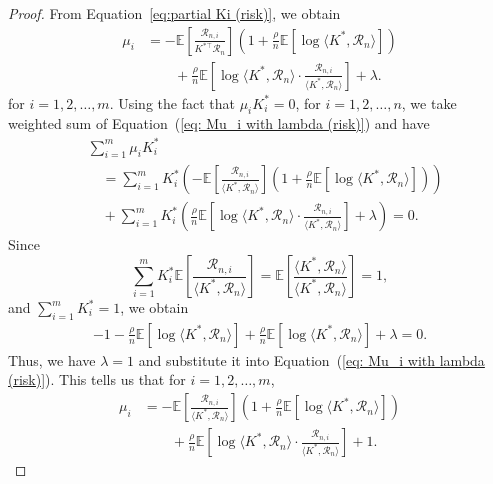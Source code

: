 \documentclass[10pt,a4paper]{amsart}
\begin{document}
\begin{proof}
From Equation~\eqref{eq:partial Ki (risk)}, we obtain
    \begin{align} \label{eq: Mu_i with lambda (risk)}
        \mu_i 
        &= -\mathbb{E}\left[ \frac{\mathcal{R}_{n,i}}{K^{*\top}\mathcal{R}_n} \right] \left( 1 + \frac{\rho}{n}\mathbb{E}\left[ \log \langle K^{*}, \mathcal{R}_n \rangle \right] \right) \nonumber \\
        &\qquad +\frac{\rho}{n}\mathbb{E}\left[ \log \langle K^{*}, \mathcal{R}_n \rangle \cdot \frac{\mathcal{R}_{n,i}}{ \langle K^{*}, \mathcal{R}_n \rangle }  \right] +\lambda.
    \end{align}
for $i=1,2, \ldots, m$. Using the fact that $\mu_i K_i^* = 0$, for $i=1,2,\dots,n$, we take weighted sum of Equation~(\ref{eq: Mu_i with lambda (risk)}) and have
    \begin{align*}
        &\sum_{i=1}^m \mu_i K_i^* \\
        &\quad = \sum_{i=1}^m K_i^* \left( -\mathbb{E}\left[ \frac{\mathcal{R}_{n,i}}{ \langle K^{*}, \mathcal{R}_n \rangle } \right] \left( 1 + \frac{\rho}{n}\mathbb{E}\left[ \log \langle K^{*}, \mathcal{R}_n \rangle \right] \right) \right) \\
        &\quad + \sum_{i=1}^m K_i^* \left( \frac{\rho}{n} \mathbb{E} \left[ \log \langle K^{*}, \mathcal{R}_n\rangle \cdot \frac{ \mathcal{R}_{n,i} }{\langle K^{*}, \mathcal{R}_n \rangle}  \right] + \lambda \right) = 0. 
    \end{align*}
Since 
$$
\sum_{i=1}^m K_i^* \mathbb{E}\left[ \frac{\mathcal{R}_{n,i}}{\langle K^{*}, \mathcal{R}_n \rangle } \right] 
= \mathbb{E}\left[  \frac{\langle K^{*}, \mathcal{R}_n \rangle }{\langle K^{*}, \mathcal{R}_n \rangle} \right] = 1, 
$$
and $\sum_{i=1}^m K_i^* = 1$, we obtain
    \begin{align}
        -1 - \frac{\rho}{n} \mathbb{E}\left[ \log \langle K^{*}, \mathcal{R}_n \rangle \right] + \frac{\rho}{n} \mathbb{E}\left[ \log \langle K^{*}, \mathcal{R}_n \rangle \right] +\lambda = 0.
    \end{align}
Thus, we have $\lambda=1$ and substitute it into Equation~(\ref{eq: Mu_i with lambda (risk)}). This tells us that for $i=1,2, \ldots, m$,
    \begin{align*}
        \mu_i 
        &= -\mathbb{E}\left[ \frac{\mathcal{R}_{n,i}}{\langle K^{*}, \mathcal{R}_n \rangle } \right] \left( 1 + \frac{\rho}{n} \mathbb{E}\left[ \log \langle K^{*}, \mathcal{R}_n \rangle \right] \right) \nonumber \\
        &\qquad + \frac{\rho}{n}\mathbb{E}\left[ \log \langle K^{*}, \mathcal{R}_n \rangle  \cdot \frac{\mathcal{R}_{n,i}}{\langle K^{*}, \mathcal{R}_n \rangle }  \right] + 1.

\end{align*}
\end{proof}
\end{document}
